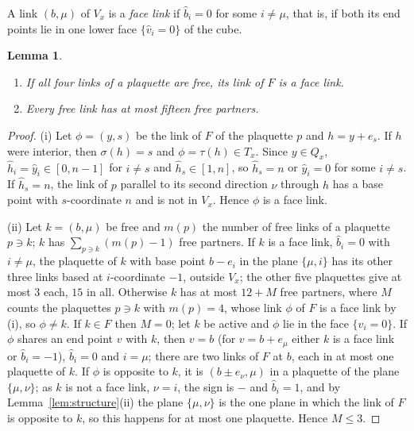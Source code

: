 \documentclass[11pt]{amsart}
\newtheorem{lemma}[theorem]{Lemma}
\theoremstyle{definition}
\theoremstyle{remark}
\numberwithin{equation}{section}
\begin{document}
A link $(b,\mu)$ of $V_x$ is a \emph{face link} if $\hat b_i=0$ for some
$i\ne\mu$, that is, if both its end points lie in one lower face
$\{\hat v_i=0\}$ of the cube.

\begin{lemma}\label{lem:fifteen}
\begin{enumerate}[label=\textup{(\roman*)},leftmargin=*]
\item If all four links of a plaquette are free, its link of $F$ is a face
link.
\item Every free link has at most fifteen free partners.
\end{enumerate}
\end{lemma}

\begin{proof}
(i) Let $\phi=(y,s)$ be the link of $F$ of the plaquette $p$ and $h=y+e_s$.
If $h$ were interior, then $\sigma(h)=s$ and $\phi=\tau(h)\in T_x$. Since $y\in
Q_x$, $\hat h_i=\hat y_i\in[0,n-1]$ for $i\ne s$ and $\hat h_s\in[1,n]$, so
$\hat h_s=n$ or $\hat y_i=0$ for some $i\ne s$. If $\hat h_s=n$, the link of
$p$ parallel to its second direction $\nu$ through $h$ has a base point with
$s$-coordinate $n$ and is not in $V_x$. Hence $\phi$ is a face link.

(ii) Let $k=(b,\mu)$ be free and $m(p)$ the number of free links of a
plaquette $p\ni k$; $k$ has $\sum_{p\ni k}(m(p)-1)$ free partners. If $k$ is a
face link, $\hat b_i=0$ with $i\ne\mu$, the plaquette of $k$ with base point
$b-e_i$ in the plane $\{\mu,i\}$ has its other three links based at
$i$-coordinate $-1$, outside $V_x$; the other five plaquettes give at most $3$
each, $15$ in all. Otherwise $k$ has at most $12+M$ free partners, where $M$
counts the plaquettes $p\ni k$ with $m(p)=4$, whose link $\phi$ of $F$ is a face
link by (i), so $\phi\ne k$. If $k\in F$ then $M=0$; let $k$ be active and
$\phi$ lie in the face $\{\hat v_i=0\}$. If $\phi$ shares an end point $v$ with
$k$, then $v=b$ (for $v=b+e_\mu$ either $k$ is a face link or $\hat b_i=-1$),
$\hat b_i=0$ and $i=\mu$; there are two links of $F$ at $b$, each in at most
one plaquette of $k$. If $\phi$ is opposite to $k$, it is $(b\pm e_\nu,\mu)$
in a plaquette of the plane $\{\mu,\nu\}$; as $k$ is not a face link, $\nu=i$,
the sign is $-$ and $\hat b_i=1$, and by Lemma~\ref{lem:structure}(ii) the
plane $\{\mu,\nu\}$ is the one plane in which the link of $F$ is opposite to
$k$, so this happens for at most one plaquette. Hence $M\le3$.
\end{proof}
\end{document}
